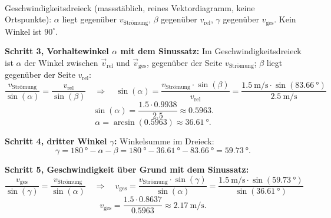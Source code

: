 \documentclass[addpoints,11pt,a4paper]{exam}
\begin{document}
\begin{vertiefungbox}
\begin{center}
\\[-0.1em]
{\scriptsize Geschwindigkeitsdreieck (massstäblich, reines Vektordiagramm,
keine Ortspunkte): $\alpha$ liegt gegenüber $v_{\text{Strömung}}$,
$\beta$ gegenüber $v_{\text{rel}}$, $\gamma$ gegenüber $v_{\text{ges}}$.
Kein Winkel ist $90^\circ$.}
\end{center}

\textbf{Schritt 3, Vorhaltewinkel $\alpha$ mit dem Sinussatz:} Im
Geschwindigkeitsdreieck ist $\alpha$ der Winkel zwischen
$\vec{v}_{\text{rel}}$ und $\vec{v}_{\text{ges}}$, gegenüber der Seite
$v_{\text{Strömung}}$; $\beta$ liegt gegenüber der Seite $v_{\text{rel}}$:
\[
  \frac{v_{\text{Strömung}}}{\sin(\alpha)} = \frac{v_{\text{rel}}}{\sin(\beta)}
  \quad\Longrightarrow\quad
  \sin(\alpha) = \frac{v_{\text{Strömung}}\cdot\sin(\beta)}{v_{\text{rel}}} = \frac{\SI{1.5}{\meter\per\second}\cdot\sin(\SI{83.66}{\degree})}{\SI{2.5}{\meter\per\second}}
\]
\[
  \sin(\alpha) = \frac{1.5\cdot0.9938}{2.5} \approx 0.5963.
\]
\[
  \boxed{\alpha = \arcsin(0.5963) \approx \SI{36.61}{\degree}}.
\]

\textbf{Schritt 4, dritter Winkel $\gamma$:} Winkelsumme im Dreieck:
\[
  \gamma = \SI{180}{\degree} - \alpha - \beta = \SI{180}{\degree} - \SI{36.61}{\degree} - \SI{83.66}{\degree} = \SI{59.73}{\degree}.
\]

\textbf{Schritt 5, Geschwindigkeit über Grund mit dem Sinussatz:}
\[
  \frac{v_{\text{ges}}}{\sin(\gamma)} = \frac{v_{\text{Strömung}}}{\sin(\alpha)}
  \quad\Longrightarrow\quad
  v_{\text{ges}} = \frac{v_{\text{Strömung}}\cdot\sin(\gamma)}{\sin(\alpha)} = \frac{\SI{1.5}{\meter\per\second}\cdot\sin(\SI{59.73}{\degree})}{\sin(\SI{36.61}{\degree})}
\]
\[
  v_{\text{ges}} = \frac{1.5\cdot0.8637}{0.5963} \approx \SI{2.17}{\meter\per\second}.
\]


\end{vertiefungbox}
\end{document}
